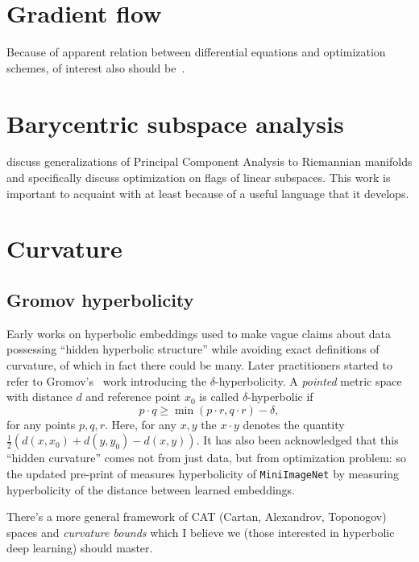 \section*{Gradient flow}

Because of apparent relation between differential equations and optimization
schemes, of interest also should
be~\citet{ambrosioGradientFlows,ambrosioOTSummerSchool}.

\section*{Barycentric subspace analysis}

\citet{baryPennec} discuss generalizations of Principal Component Analysis to
Riemannian manifolds and specifically discuss optimization on flags of linear
subspaces. This work is important to acquaint with at least because of a useful
language that it develops.
\section{Curvature} \label{sec:curvature}

\subsection*{Gromov hyperbolicity}

Early works on hyperbolic embeddings used to make vague claims about data
possessing ``hidden hyperbolic structure'' while avoiding exact definitions of
curvature, of which in fact there could be many. Later practitioners started
to refer to Gromov's~\cite{gromov} work introducing the \( \delta
\)-hyperbolicity. A \emph{pointed} metric space with distance \( d \) and reference point \( x_0 \) is called \( \delta \)-hyperbolic if
\[ p\cdot q \geq \min(p\cdot r, q\cdot r) - \delta, \]
for any points \( p, q, r \).
Here, for any \(x, y \) the \( x\cdot y \)
denotes the quantity \( \frac12 (d(x, x_0) + d(y, y_0) - d(x, y)) \).
It has also been acknowledged that this ``hidden curvature'' comes not from
just data, but from optimization problem: so the updated pre-print of
\citet{khrulkov} measures hyperbolicity of \texttt{MiniImageNet} by measuring
hyperbolicity of the distance between learned embeddings.

There's a more general framework of CAT (Cartan, Alexandrov, Toponogov) spaces
and \emph{curvature bounds} which I believe we (those interested in hyperbolic
deep learning) should master.

